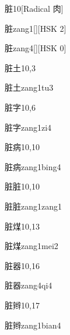 \begin{entry}{脏}{10}[Radical 肉]
  \begin{phonetics}{脏}{zang1}[][HSK 2]
  \end{phonetics}
  \begin{phonetics}{脏}{zang4}[][HSK 0]
  \end{phonetics}
\end{entry}

\begin{entry}{脏土}{10,3}
  \begin{phonetics}{脏土}{zang1tu3}
  \end{phonetics}
\end{entry}

\begin{entry}{脏字}{10,6}
  \begin{phonetics}{脏字}{zang1zi4}
  \end{phonetics}
\end{entry}

\begin{entry}{脏病}{10,10}
  \begin{phonetics}{脏病}{zang1bing4}
  \end{phonetics}
\end{entry}

\begin{entry}{脏脏}{10,10}
  \begin{phonetics}{脏脏}{zang1zang1}
  \end{phonetics}
\end{entry}

\begin{entry}{脏煤}{10,13}
  \begin{phonetics}{脏煤}{zang1mei2}
  \end{phonetics}
\end{entry}

\begin{entry}{脏器}{10,16}
  \begin{phonetics}{脏器}{zang4qi4}
  \end{phonetics}
\end{entry}

\begin{entry}{脏辫}{10,17}
  \begin{phonetics}{脏辫}{zang1bian4}
  \end{phonetics}
\end{entry}

